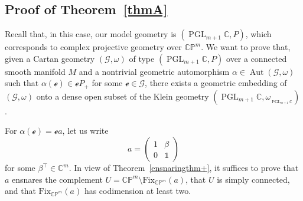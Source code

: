 \documentclass[10pt,a4paper]{amsart}
\numberwithin{equation}{section}
\theoremstyle{definition}
\DeclareMathOperator{\Aut}{\mathrm{Aut}}
\DeclareMathOperator{\PGL}{\mathrm{PGL}}
\newcommand{\MC}[1]{\omega_{{}_{#1}}}
\begin{document}
\subsection{Proof of Theorem~\ref{thmA}} Recall that, in this case, our model geometry is $(\PGL_{m+1}\mathbb{C},P)$, which corresponds to complex projective geometry over $\mathbb{CP}^m$. We want to prove that, given a Cartan geometry $(\mathscr{G},\omega)$ of type $(\PGL_{m+1}\mathbb{C},P)$ over a connected smooth manifold $M$ and a nontrivial geometric automorphism $\alpha\in\Aut(\mathscr{G},\omega)$ such that $\alpha(\mathscr{e})\in\mathscr{e}P_+$ for some $\mathscr{e}\in\mathscr{G}$, there exists a geometric embedding of $(\mathscr{G},\omega)$ onto a dense open subset of the Klein geometry $(\PGL_{m+1}\mathbb{C},\MC{\PGL_{m+1}\mathbb{C}})$.

For $\alpha(\mathscr{e})=\mathscr{e}a$, let us write \[a=\begin{pmatrix}1 & \beta \\ 0 & \mathds{1}\end{pmatrix}\] for some $\beta^\top\in\mathbb{C}^m$. In view of Theorem~\ref{ensnaringthm+}, it suffices to prove that $a$ ensnares the complement $U=\mathbb{CP}^m\setminus\mathrm{Fix}_{\mathbb{CP}^m}(a)$, that $U$ is simply connected, and that $\mathrm{Fix}_{\mathbb{CP}^m}(a)$ has codimension at least two.
\end{document}
